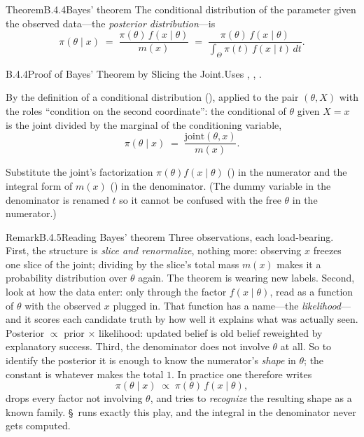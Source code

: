 \documentclass[main.tex]{subfiles}
\begin{document}
\begin{Obj}{Theorem}{B.4.4}{Bayes' theorem}
The conditional distribution of the parameter given the observed data---the
\emph{posterior distribution}---is
\[ \pi(\theta \mid x) \;=\; \frac{\pi(\theta)\, f(x\mid\theta)}{m(x)}
   \;=\; \frac{\pi(\theta)\, f(x\mid\theta)}
   {\displaystyle\int_{\Theta} \pi(t)\, f(x\mid t)\, dt} . \]
\end{Obj}
\begin{Prf}{B.4.4}{Proof of Bayes' Theorem by Slicing the Joint.}{Uses , , .}
\item By the definition of a conditional distribution (), applied to the pair
      $(\theta, X)$ with the roles ``condition on the second coordinate'': the conditional
      of $\theta$ given $X=x$ is the joint divided by the marginal of the conditioning
      variable,
      \[ \pi(\theta\mid x) \;=\; \frac{\text{joint}(\theta,x)}{m(x)} . \]
\item Substitute the joint's factorization $\pi(\theta)f(x\mid\theta)$ () in
      the numerator and the integral form of $m(x)$ () in the denominator.
      (The dummy variable in the denominator is renamed $t$ so it cannot be confused with
      the free $\theta$ in the numerator.)
\end{Prf}

\begin{ObjL}{Remark}{B.4.5}{Reading Bayes' theorem}
Three observations, each load-bearing.
First, the structure is \emph{slice and renormalize}, nothing more: observing $x$ freezes
one slice of the joint; dividing by the slice's total mass $m(x)$ makes it a probability
distribution over $\theta$ again. The theorem is  wearing new labels.
Second, look at how the data enter: only through the factor $f(x\mid\theta)$, read as a
function of $\theta$ with the observed $x$ plugged in. That function has a name---the
\emph{likelihood}---and it scores each candidate truth by how well it explains what was
actually seen. Posterior $\propto$ prior $\times$ likelihood: updated belief is old belief
reweighted by explanatory success.
Third, the denominator does not involve $\theta$ at all. So to identify the posterior it is
enough to know the numerator's \emph{shape} in $\theta$; the constant is whatever makes the
total $1$. In practice one therefore writes
\[ \pi(\theta\mid x) \;\propto\; \pi(\theta)\, f(x\mid\theta) , \]
drops every factor not involving $\theta$, and tries to \emph{recognize} the resulting
shape as a known family. \S\, runs exactly this play, and the integral in the
denominator never gets computed.
\end{ObjL}
\end{document}
